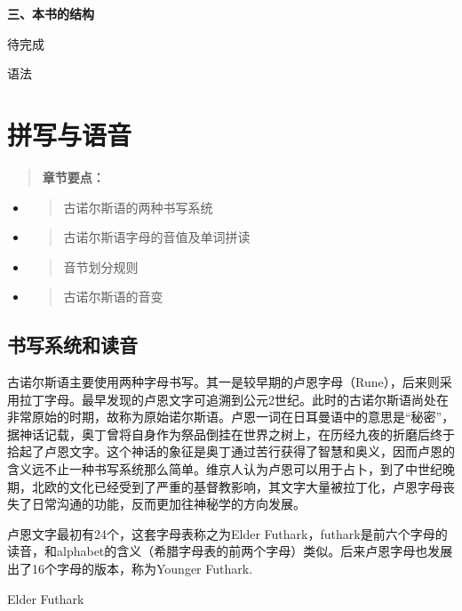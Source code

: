 \textbf{三、本书的结构}

待完成

语法

\section{拼写与语音}\label{拼写与语音}

\begin{quote}
  \textbf{章节要点：}
\end{quote}

\begin{itemize}
  \item
        \begin{quote}
          古诺尔斯语的两种书写系统
        \end{quote}
  \item
        \begin{quote}
          古诺尔斯语字母的音值及单词拼读
        \end{quote}
  \item
        \begin{quote}
          音节划分规则
        \end{quote}
  \item
        \begin{quote}
          古诺尔斯语的音变
        \end{quote}
\end{itemize}

\subsection{书写系统和读音}\label{书写系统和读音}

古诺尔斯语主要使用两种字母书写。其一是较早期的卢恩字母（Rune），后来则采用拉丁字母。最早发现的卢恩文字可追溯到公元2世纪。此时的古诺尔斯语尚处在非常原始的时期，故称为原始诺尔斯语。卢恩一词在日耳曼语中的意思是``秘密''，据神话记载，奥丁曾将自身作为祭品倒挂在世界之树上，在历经九夜的折磨后终于拾起了卢恩文字。这个神话的象征是奥丁通过苦行获得了智慧和奥义，因而卢恩的含义远不止一种书写系统那么简单。维京人认为卢恩可以用于占卜，到了中世纪晚期，北欧的文化已经受到了严重的基督教影响，其文字大量被拉丁化，卢恩字母丧失了日常沟通的功能，反而更加往神秘学的方向发展。

卢恩文字最初有24个，这套字母表称之为Elder
Futhark，futhark是前六个字母的读音，和alphabet的含义（希腊字母表的前两个字母）类似。后来卢恩字母也发展出了16个字母的版本，称为Younger
Futhark.

Elder Futhark

